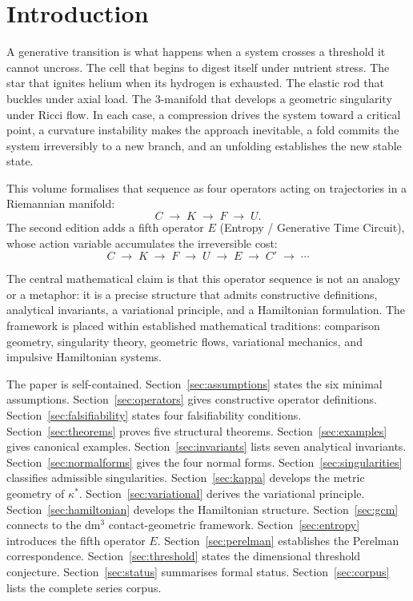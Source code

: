 \documentclass[12pt,a4paper]{article}
\begin{document}
\tableofcontents
\bigskip

\section{Introduction}
\label{sec:intro}

A generative transition is what happens when a system crosses a
threshold it cannot uncross.
The cell that begins to digest itself under nutrient stress.
The star that ignites helium when its hydrogen is exhausted.
The elastic rod that buckles under axial load.
The 3-manifold that develops a geometric singularity under Ricci flow.
In each case, a compression drives the system toward a critical point,
a curvature instability makes the approach inevitable, a fold commits
the system irreversibly to a new branch, and an unfolding establishes
the new stable state.

This volume formalises that sequence as four operators acting on
trajectories in a Riemannian manifold:
\[
  C \;\longrightarrow\; K \;\longrightarrow\; F
  \;\longrightarrow\; U.
\]
The second edition adds a fifth operator $E$ (Entropy / Generative
Time Circuit), whose action variable accumulates the irreversible cost:
\[
  C \;\longrightarrow\; K \;\longrightarrow\; F
  \;\longrightarrow\; U \;\longrightarrow\; E \;\longrightarrow\; C'
  \;\longrightarrow\; \cdots
\]

The central mathematical claim is that this operator sequence is not
an analogy or a metaphor: it is a precise structure that admits
constructive definitions, analytical invariants, a variational
principle, and a Hamiltonian formulation.
The framework is placed within established mathematical traditions:
comparison geometry, singularity theory, geometric flows, variational
mechanics, and impulsive Hamiltonian systems.

The paper is self-contained.
Section~\ref{sec:assumptions} states the six minimal assumptions.
Section~\ref{sec:operators} gives constructive operator definitions.
Section~\ref{sec:falsifiability} states four falsifiability conditions.
Section~\ref{sec:theorems} proves five structural theorems.
Section~\ref{sec:examples} gives canonical examples.
Section~\ref{sec:invariants} lists seven analytical invariants.
Section~\ref{sec:normalforms} gives the four normal forms.
Section~\ref{sec:singularities} classifies admissible singularities.
Section~\ref{sec:kappa} develops the metric geometry of $\kappa^*$.
Section~\ref{sec:variational} derives the variational principle.
Section~\ref{sec:hamiltonian} develops the Hamiltonian structure.
Section~\ref{sec:gcm} connects to the dm$^3$ contact-geometric framework.
Section~\ref{sec:entropy} introduces the fifth operator $E$.
Section~\ref{sec:perelman} establishes the Perelman correspondence.
Section~\ref{sec:threshold} states the dimensional threshold conjecture.
Section~\ref{sec:status} summarises formal status.
Section~\ref{sec:corpus} lists the complete series corpus.
\end{document}
